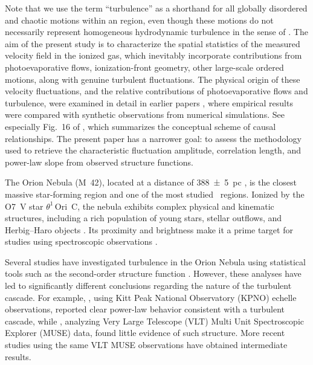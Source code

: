 \documentclass[fleqn,usenatbib, useAMS, a4paper]{mnras}
\newcommand\hii{\ion{H}{II}}
\begin{document}
Note that we use the term ``turbulence'' as a shorthand
for all globally disordered and chaotic motions within an \hii{} region,
even though these motions do not necessarily represent homogeneous hydrodynamic turbulence
in the sense of \citet{kolm1}.
The aim of the present study is to characterize the spatial
statistics of the measured velocity field in the ionized gas,
which inevitably incorporate contributions from photoevaporative flows, ionization-front geometry, other large-scale ordered motions, along with genuine turbulent fluctuations.
The physical origin of these velocity fluctuations, and the relative contributions of photoevaporative flows and turbulence, were examined in detail in earlier papers \citep{Medina:2014a, arthur2016turbulence},
where empirical results were compared with synthetic observations from numerical simulations. See especially Fig.~16 of \citet{arthur2016turbulence},
which summarizes the conceptual scheme of causal relationships.
The present paper has a narrower goal: to assess the methodology used to retrieve the characteristic fluctuation amplitude, correlation length, and power-law slope from observed structure functions.


The Orion Nebula (M~42), located at a distance of
\qty{388(5)}{pc}
\citetext{\(\qty{1}{\arcsecond} \approx \qty{0.0019}{pc}\); \citealp{Kounkel:2017a}},
is the closest massive star-forming region and one of the most studied \hii\ regions. 
Ionized by the O7~V star $\theta^1$\,Ori~C, the nebula exhibits complex physical and kinematic structures, including a rich population of young stars, stellar outflows, and Herbig–Haro objects \citep{1993ApJ...410..696O,2001ARA&A..39...99O,Garcia-Diaz:2007a,2009AJ....137..367O,2019MNRAS.486.3423H,2021MNRAS.502.1703M}. 
Its proximity and brightness make it a prime target for studies using spectroscopic observations \citep{Garcia-Diaz:2008a,2015A&A...582A.114W,2016ApJ...819..136A}.

Several studies have investigated turbulence in the Orion Nebula using statistical tools such as the second-order structure function \citep{von1951methode,1955IAUS....2..131C,munch1958internal,castaneda1988,1992ApJ...387..229O,arthur2016turbulence,2016MNRAS.455.4057M,2019MNRAS.483..704A}. 
However, these analyses have led to significantly different conclusions regarding the nature of the turbulent cascade. 
For example, \citet{arthur2016turbulence}, using Kitt Peak National Observatory (KPNO) echelle observations, reported clear power-law behavior consistent with a turbulent cascade, while \citet{2016MNRAS.455.4057M}, analyzing Very Large Telescope (VLT) Multi Unit Spectroscopic Explorer (MUSE) data, found little evidence of such structure. 
More recent studies using the same VLT MUSE observations \citep{2019MNRAS.483..704A} have obtained intermediate results.
\end{document}
